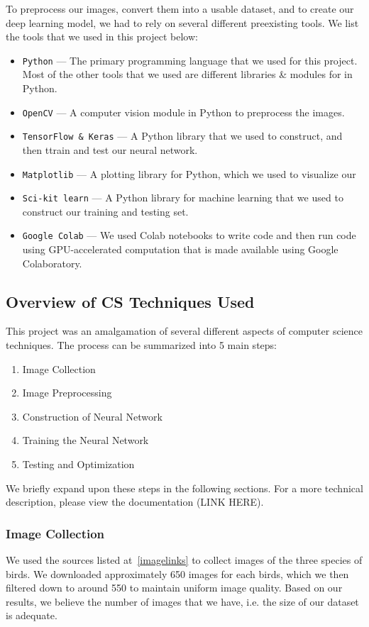 \documentclass{article}
\begin{document}
  To preprocess our images, convert them into a usable dataset, and to create
  our deep learning model, we had to rely on several different preexisting tools.
  We list the tools that we used in this project below:
  \setlength{\parskip}{0em}
  \begin{itemize}
    \item \texttt{Python} --- The primary programming language that we used for this project.
      Most of the other tools that we used are different libraries \& modules for in Python.
    \item \texttt{OpenCV} --- A computer vision module in Python to preprocess the images. 
    \item \texttt{TensorFlow \& Keras} --- A Python library that we used to construct, and then 
      ttrain and test our neural network. 
    \item \texttt{Matplotlib} --- A plotting library for Python, which we used to visualize our
    \item \texttt{Sci-kit learn} --- A Python library for machine learning that we used to 
      construct our training and testing set. 
    \item \texttt{Google Colab} --- We used Colab notebooks to write code and then run code
      using GPU-accelerated computation that is made available using Google Colaboratory.
  \end{itemize}
 
\subsection{Overview of CS Techniques Used}
  This project was an amalgamation of several different aspects of computer science techniques.
  The process can be summarized into 5 main steps:
  \begin{enumerate}
    \item Image Collection
    \item Image Preprocessing 
    \item Construction of Neural Network 
    \item Training the Neural Network
    \item Testing and Optimization
  \end{enumerate}
  
  We briefly expand upon these steps in the following sections. For a more technical 
  description, please view the documentation (LINK HERE). 

  \subsubsection{Image Collection}
  We used the sources listed at~\ref{imagelinks} to collect images of the three species of birds.
  We downloaded approximately 650 images for each birds, which we then filtered
  down to around 550 to maintain uniform image quality. Based on our results, we believe
  the number of images that we have, i.e. the size of our dataset is adequate. 
  
\end{document}
